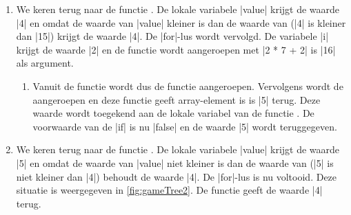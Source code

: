 \begin{cpplstShortInline}
\begin{enumerate}[leftmargin=1.4em]
\begin{enumerate}[label*=\arabic*.,leftmargin=1.4em]
\begin{enumerate}[label*=\arabic*.,leftmargin=1.4em]
\begin{enumerate}[label*=\arabic*.,leftmargin=1.4em]
\begin{enumerate}[label*=\arabic*.,leftmargin=1.4em]
					Deze waarde wordt toegekend aan de lokale variabel  van de functie .
					De voorwaarde van de |if| is nu |false| en de waarde |4| wordt teruggegeven.
				\end{enumerate}
				\item We keren terug naar de functie .
				De lokale variabele |value| krijgt de waarde |4| en omdat de waarde van |value| kleiner is dan de waarde van  (|4| is kleiner dan |15|) krijgt  de waarde |4|.
				De |for|-lus wordt vervolgd.
				De variabele |i| krijgt de waarde |2| en de functie  wordt aangeroepen met |2 * 7 + 2| is |16| als argument.
				\begin{enumerate}[label*=\arabic*.,leftmargin=1.4em]
					\item Vanuit de functie  wordt dus de functie  aangeroepen.
					Vervolgens wordt de  aangeroepen en deze functie geeft array-element  is  is |5| terug.
					Deze waarde wordt toegekend aan de lokale variabel  van de functie .
					De voorwaarde van de |if| is nu |false| en de waarde |5| wordt teruggegeven.
				\end{enumerate}
				\item We keren terug naar de functie .
				De lokale variabele |value| krijgt de waarde |5| en omdat de waarde van |value| niet kleiner is dan de waarde van  (|5| is niet kleiner dan |4|) behoudt  de waarde |4|.
				De |for|-lus is nu voltooid.
				Deze situatie is weergegeven in \cref{fig:gameTree2}.
				De functie  geeft de waarde |4| terug.
				
				

\end{enumerate}
\end{enumerate}
\end{enumerate}
\end{enumerate}
\end{cpplstShortInline}
